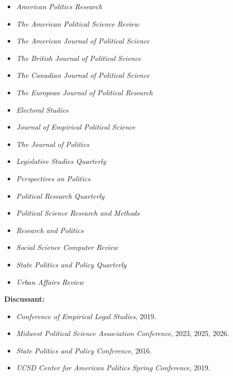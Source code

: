 \documentclass[margin,line]{res}
\newenvironment{list1}{
  \begin{list}{\ding{113}}{%
      \setlength{\itemsep}{0in}
      \setlength{\parsep}{0in} \setlength{\parskip}{0in}
      \setlength{\topsep}{0in} \setlength{\partopsep}{0in} 
      \setlength{\leftmargin}{0.17in}}}{\end{list}}
\begin{document}
\begin{resume}
\begin{itemize}
\item \textit{American Politics Research}
\item \textit{The American Political Science Review}
\item \textit{The American Journal of Political Science}
\item \textit{The British Journal of Political Science}
\item \textit{The Canadian Journal of Political Science}
\item \textit{The European Journal of Political Research}
\item \textit{Electoral Studies}
\item \textit{Journal of Empirical Political Science}
\item \textit{The Journal of Politics}
\item \textit{Legislative Studies Quarterly}
\item \textit{Perspectives on Politics}
\item \textit{Political Research Quarterly}
\item \textit{Political Science Research and Methods}
\item \textit{Research and Politics}
\item \textit{Social Science Computer Review}
\item \textit{State Politics and Policy Quarterly}
\item \textit{Urban Affairs Review}
\end{itemize}

{\bf Discussant:}
\begin{itemize}
\item \textit{Conference of Empirical Legal Studies}, 2019.
\item \textit{Midwest Political Science Association Conference}, 2023, 2025, 2026.
\item \textit{State Politics and Policy Conference}, 2016. 
\item \textit{UCSD Center for American Politics Spring Conference}, 2019.
\end{itemize}

%



\end{resume}
\end{document}
